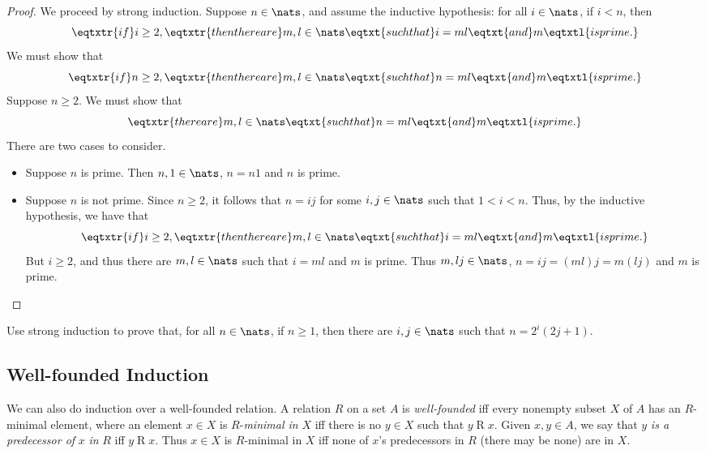 \begin{proof}
We proceed by strong induction.  Suppose $n\in\nats$, and assume the
inductive hypothesis: for all $i\in\nats$, if $i<n$, then
\begin{displaymath}
\eqtxtr{if}i\geq 2,
\eqtxtr{then there are}m,l\in\nats\eqtxt{such that}i=ml\eqtxt{and}m
\eqtxtl{is prime.}
\end{displaymath}
We must show that
\begin{displaymath}
\eqtxtr{if}n\geq 2,
\eqtxtr{then there are}m,l\in\nats\eqtxt{such that}n=ml\eqtxt{and}m
\eqtxtl{is prime.}
\end{displaymath}
Suppose $n\geq 2$.  We must show that
\begin{displaymath}
\eqtxtr{there are}m,l\in\nats\eqtxt{such that}n=ml\eqtxt{and}m
\eqtxtl{is prime.}
\end{displaymath}
There are two cases to consider.
\begin{itemize}
\item Suppose $n$ is prime.  Then $n,1\in\nats$, $n=n1$ and $n$ is prime.

\item Suppose $n$ is not prime.  Since $n\geq 2$, it follows that $n=ij$ for
some $i,j\in\nats$ such that $1<i<n$.  Thus, by the inductive
hypothesis, we have that
\begin{displaymath}
\eqtxtr{if}i\geq 2,
\eqtxtr{then there are}m,l\in\nats\eqtxt{such that}i=ml\eqtxt{and}m
\eqtxtl{is prime.}
\end{displaymath}
But $i\geq 2$, and thus there are $m,l\in\nats$ such that
$i=ml$ and $m$ is prime.
Thus $m,lj\in\nats$, $n=ij=(ml)j=m(lj)$ and $m$ is prime.
\end{itemize}
\end{proof}

\begin{exercise}
Use strong induction to prove that, for all $n\in\nats$, if
$n\geq 1$, then there are $i,j\in\nats$ such that $n=2^i(2j + 1)$.
\end{exercise}

\subsection{Well-founded Induction}

We can also do induction over a well-founded relation.  A relation $R$
on a set $A$ is \emph{well-founded} iff every nonempty subset $X$ of
%
%
$A$ has an $R$-minimal element, where an element $x\in X$ is
$R$-\emph{minimal in} $X$ iff
%
%
there is no $y\in X$ such that $y\mathrel{R}x$.
Given $x,y\in A$, we say that $y$ \emph{is a predecessor
%
%
%
of} $x$ \emph{in} $R$ iff $y\mathrel{R}x$.  Thus $x\in X$ is
$R$-minimal in $X$ iff none of $x$'s predecessors in $R$ (there may
be none) are in $X$.

